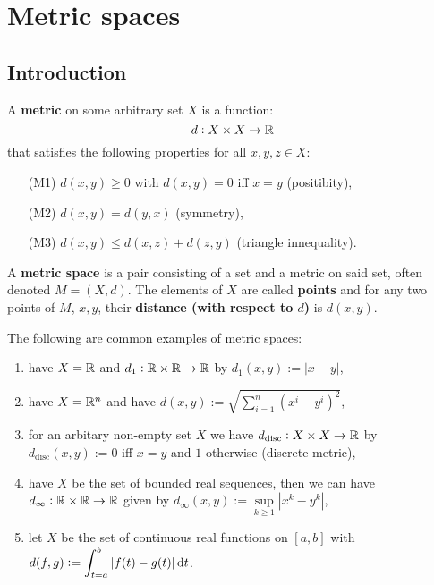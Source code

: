 \documentclass[../Year2.tex]{subfiles}
\begin{document}
\section{Metric spaces}

\subsection{Introduction}

\begin{definition}[Metric]
    A \textbf{metric} on some arbitrary set $X$ is a function: \[
        d:X\times X\rightarrow\mathbb{R}
    \] that satisfies the following properties for all $x,y,z\in X$: \begin{enumerate}
        \item[(M1)] $d(x,y)\geq 0$ with $d(x,y)=0$ iff $x=y$ (positibity),
        \item[(M2)] $d(x,y)=d(y,x)$ (symmetry),
        \item[(M3)] $d(x,y) \leq d(x,z) + d(z,y)$ (triangle innequality).
    \end{enumerate}
\end{definition}

\begin{definition}
    A \textbf{metric space} is a pair consisting of a set and a metric on said set, often denoted $M=(X,d)$. The elements of $X$ are called \textbf{points} and for any two points of $M$, $x,y$, their \textbf{distance (with respect to $d$)} is $d(x,y)$.
\end{definition}

\begin{examples}
    The following are common examples of metric spaces: \begin{enumerate}
        \item have $X=\mathbb{R}$ and $d_1:\mathbb{R}\times\mathbb{R}\rightarrow\mathbb{R}$ by $d_1(x,y):=|x-y|$,
        \item have $X=\mathbb{R}^n$ and have $\displaystyle d(x,y):=\sqrt{\sum_{i=1}^n{(x^i-y^i)}^2}$,
        \item for an arbitary non-empty set $X$ we have $d_\text{disc}:X\times X\rightarrow\mathbb{R}$ by $d_\text{disc}(x,y):=0$ iff $x=y$ and $1$ otherwise (discrete metric),
        \item have $X$ be the set of bounded real sequences, then we can have $d_\infty:\mathbb{R}\times\mathbb{R}\rightarrow\mathbb{R}$ given by $d_\infty(x,y) := \sup\limits_{k\geq1}|x^k-y^k|$,
        \vspace{-10pt}
        \item let $X$ be the set of continuous real functions on $[a,b]$ with $\displaystyle d(f,g):=\intd{t=a}{b}{|f(t)-g(t)|}{t}$.
    \end{enumerate}
\end{examples}
\end{document}
